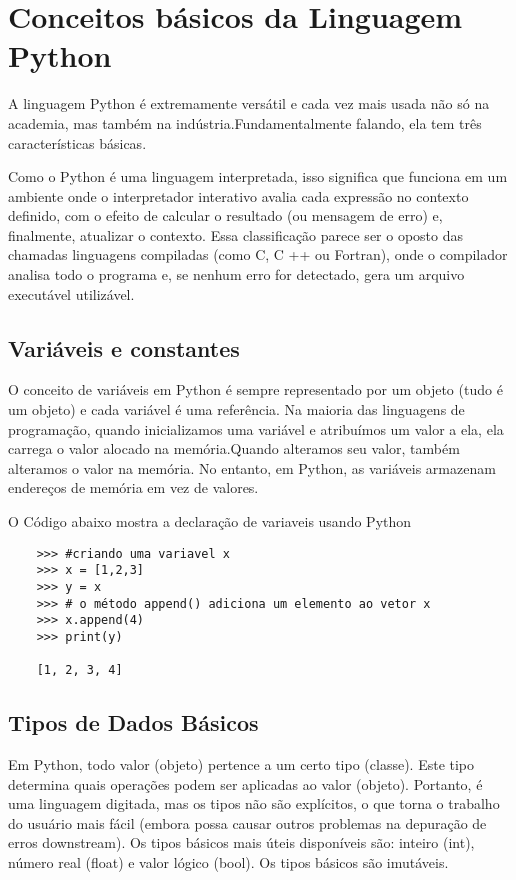 

\chapter{ Conceitos b\'{a}sicos da Linguagem Python}

A linguagem Python é extremamente versátil e cada vez mais usada não só na academia, mas também na indústria.Fundamentalmente falando, ela tem três características básicas.

Como o Python é uma linguagem interpretada, isso significa que funciona em um ambiente onde o interpretador interativo avalia cada expressão no contexto definido, com o efeito de calcular o resultado (ou mensagem de erro) e, finalmente, atualizar o contexto. Essa classificação parece ser o oposto das chamadas linguagens compiladas (como C, C ++ ou Fortran), onde o compilador analisa todo o programa e, se nenhum erro for detectado, gera um arquivo executável utilizável.

    \section{Vari\'{a}veis e constantes}
  O conceito de variáveis em Python é sempre representado por um objeto (tudo é um objeto) e cada variável é uma referência. Na maioria das linguagens de programação, quando inicializamos uma variável e atribuímos um valor a ela, ela carrega o valor alocado na memória.Quando alteramos seu valor, também alteramos o valor na memória. No entanto, em Python, as variáveis armazenam endereços de memória em vez de valores.

    O Código abaixo mostra a declaração de variaveis usando Python

    \begin{lstlisting}
    >>> #criando uma variavel x
    >>> x = [1,2,3]
    >>> y = x
    >>> # o método append() adiciona um elemento ao vetor x
    >>> x.append(4)
    >>> print(y)

    [1, 2, 3, 4]
    \end{lstlisting}    

    \section{Tipos de Dados B\'{a}sicos}
    Em Python, todo valor (objeto) pertence a um certo tipo (classe). Este tipo determina quais operações podem ser aplicadas ao valor (objeto). Portanto, é uma linguagem digitada, mas os tipos não são explícitos, o que torna o trabalho do usuário mais fácil (embora possa causar outros problemas na depuração de erros downstream). Os tipos básicos mais úteis disponíveis são: inteiro (int), número real (float) e valor lógico (bool). Os tipos básicos são imutáveis.
    
